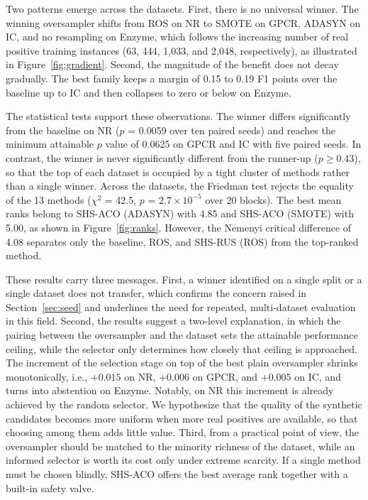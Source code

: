 \documentclass[pdflatex,sn-basic]{sn-jnl}
\begin{document}
Two patterns emerge across the datasets. First, there is no universal
winner. The winning oversampler shifts from ROS on NR to SMOTE on GPCR,
ADASYN on IC, and no resampling on Enzyme, which follows the increasing
number of real positive training instances (63, 444, 1{,}033, and
2{,}048, respectively), as illustrated in Figure~\ref{fig:gradient}.
Second, the magnitude of the benefit does not decay gradually. The best
family keeps a margin of 0.15 to 0.19 F1 points over the baseline up to
IC and then collapses to zero or below on Enzyme.

The statistical tests support these observations. The winner differs
significantly from the baseline on NR ($p$ = 0.0059 over ten paired
seeds) and reaches the minimum attainable $p$ value of 0.0625 on GPCR
and IC with five paired seeds. In contrast, the winner is never
significantly different from the runner-up ($p \geq 0.43$), so that the
top of each dataset is occupied by a tight cluster of methods rather
than a single winner. Across the datasets, the Friedman test rejects the
equality of the 13 methods ($\chi^2$ = 42.5, $p$ = $2.7 \times
10^{-5}$ over 20 blocks). The best mean ranks belong to SHS-ACO (ADASYN)
with 4.85 and SHS-ACO (SMOTE) with 5.00, as shown in
Figure~\ref{fig:ranks}. However, the Nemenyi critical difference of
4.08 separates only the baseline, ROS, and SHS-RUS (ROS) from the
top-ranked method.

These results carry three messages. First, a winner identified on a
single split or a single dataset does not transfer, which confirms the
concern raised in Section~\ref{sec:seed} and underlines the need for repeated,
multi-dataset evaluation in this field. Second, the results suggest a
two-level explanation, in which the pairing between the oversampler and
the dataset sets the attainable performance ceiling, while the selector
only determines how closely that ceiling is approached. The increment of the
selection stage on top of the best plain oversampler shrinks
monotonically, i.e., $+0.015$ on NR, $+0.006$ on GPCR, and $+0.005$ on
IC, and turns into abstention on Enzyme. Notably, on NR this increment
is already achieved by the random selector. We hypothesize that the quality
of the synthetic candidates becomes more uniform when more real
positives are available, so that choosing among them adds little value.
Third, from a practical point of view, the oversampler should be matched
to the minority richness of the dataset, while an informed selector is
worth its cost only under extreme scarcity. If a single method must be
chosen blindly, SHS-ACO offers the best average rank together with a
built-in safety valve.
\end{document}
